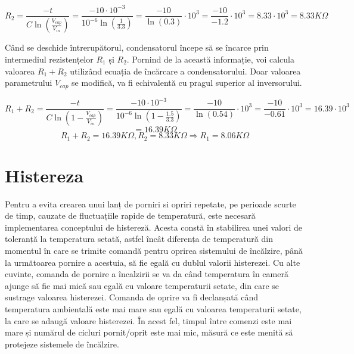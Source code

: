 \[
	R_2 = \frac{-t}{C\ln(\frac{V_{cap}}{V_{in}})} = \frac{-10 \cdot 10^{-3}}{10^{-6}\ln(\frac{1}{3.3})} = \frac{-10}{\ln(0.3)}\cdot 10^3 =  \frac{-10}{-1.2}\cdot 10^3 = 8.33 \cdot 10^3 = 8.33 K\Omega
\]

	Când se deschide întrerupătorul, condensatorul începe să se încarce prin intermediul rezistențelor $R_1$ și $R_2$. Pornind de la această informație, voi calcula valoarea $R_1 + R_2$ utilizând ecuația de încărcare a condensatorului. Doar valoarea parametrului $V_{cap}$ se modifică, va fi echivalentă cu pragul superior al inversorului. 

\[
	R_1 + R_2 = \frac{-t}{C\ln(1 - \frac{V_{cap}}{V_{in}})} = \frac{-10 \cdot 10^{-3}}{10^{-6}\ln(1 - \frac{1.5}{3.3})} = \frac{-10}{\ln(0.54)}\cdot 10^3 =  \frac{-10}{-0.61}\cdot 10^3 = 16.39 \cdot 10^3
\]
\[
	 = 16.39 K\Omega
\]
\[
	R_1 + R_2 = 16.39 K\Omega, R_2 = 8.33 K\Omega \Rightarrow R_1 = 8.06 K\Omega
\]	
	
\section{Histereza}

	Pentru a evita crearea unui lanț de porniri si opriri repetate, pe perioade scurte de timp, cauzate de fluctuațiile rapide de temperatură, este necesară implementarea conceptului de histereză. Acesta constă în stabilirea unei valori de toleranță la temperatura setată, astfel încât diferența de temperatură din momentul în care se trimite comandă pentru oprirea sistemului de încălzire, până la următoarea pornire a acestuia, să fie egală cu dublul valorii histerezei. Cu alte cuvinte, comanda de pornire a încalzirii se va da când temperatura în cameră ajunge să fie mai mică sau egală cu valoare temperaturii setate, din care se sustrage valoarea histerezei. Comanda de oprire va fi declanșată când temperatura ambientală este mai mare sau egală cu valoarea temperaturii setate, la care se adaugă valoare histerezei. În acest fel, timpul între comenzi este mai mare și numărul de cicluri pornit/oprit este mai mic, măsură ce este menită să protejeze sistemele de încălzire.


	 
 